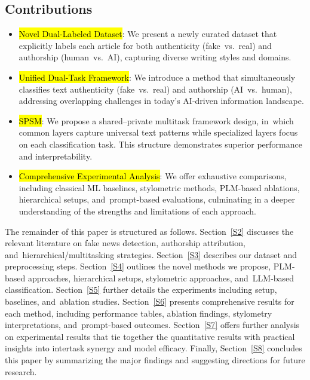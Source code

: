 \documentclass[electronics,article,accept,pdftex,moreauthors,electronics]{Definitions/mdpi}
\begin{document}
\subsection{Contributions}

\begin{itemize}
    \item {\hl{Novel Dual-Labeled Dataset}}: We present a newly curated dataset that explicitly labels each article for both authenticity (fake~vs.~real) and authorship (human~vs.~AI), capturing diverse writing styles and domains.
    \item {\hl{Unified Dual-Task Framework}}: We introduce a method that simultaneously classifies text authenticity (fake~vs.~real) and authorship (AI~vs.~human), addressing overlapping challenges in today’s AI-driven information landscape.
    \item {\hl{SPSM}}: We propose a shared--private multitask framework design, in~which common layers capture universal text patterns while specialized layers focus on each classification task. This structure demonstrates superior performance and interpretability.
    \item {\hl{Comprehensive Experimental Analysis}}: We offer exhaustive comparisons, including classical ML baselines, stylometric methods, PLM-based ablations, hierarchical setups, and~prompt-based evaluations, culminating in a deeper understanding of the strengths and limitations of each approach.
\end{itemize}

The remainder of this paper is structured as follows. Section~\ref{S2} discusses the relevant literature on fake news detection, authorship attribution, and~hierarchical/multitasking strategies. Section~\ref{S3} describes our dataset and preprocessing steps. Section~\ref{S4} outlines the novel methods we propose, PLM-based approaches, hierarchical setups, stylometric approaches, and~LLM-based classification. Section~\ref{S5} further details the experiments including setup, baselines, and~ablation studies. Section~\ref{S6} presents comprehensive results for each method, including performance tables, ablation findings, stylometry interpretations, and~prompt-based outcomes. Section~\ref{S7} offers further analysis on experimental results that tie together the quantitative results with practical insights into intertask synergy and model efficacy. Finally, Section~\ref{S8} concludes this paper by summarizing the major findings and suggesting directions for future research.
\end{document}
